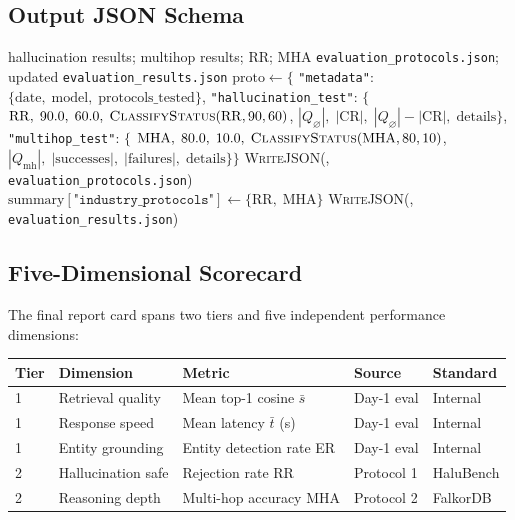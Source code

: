 \documentclass[12pt,a4paper]{article}
\theoremstyle{definition}
\theoremstyle{plain}
\theoremstyle{remark}
\begin{document}
\subsection{Output JSON Schema}

\begin{algorithm}[H]
\caption{\textsc{SaveProtocolResults} --- JSON Serialisation}
\label{alg:save}
\begin{algorithmic}[1]
\Require hallucination results; multihop results; $\mathrm{RR}$; $\mathrm{MHA}$
\Ensure \texttt{evaluation\_protocols.json}; updated \texttt{evaluation\_results.json}
\State $\text{proto} \gets \{$
\State \quad \texttt{"metadata"}: $\{\text{date},\; \text{model},\;
  \text{protocols\_tested}\}$,
\State \quad \texttt{"hallucination\_test"}: $\{$
\State \qquad $\mathrm{RR},\; 90.0,\; 60.0,\;
  \textsc{ClassifyStatus}(\mathrm{RR}, 90, 60)$,
\State \qquad $|Q_\varnothing|,\;
  |\mathrm{CR}|,\; |Q_\varnothing| - |\mathrm{CR}|,\;
  \text{details}\}$,
\State \quad \texttt{"multihop\_test"}: $\{$
\State \qquad $\mathrm{MHA},\; 80.0,\; 10.0,\;
  \textsc{ClassifyStatus}(\mathrm{MHA}, 80, 10)$,
\State \qquad $|Q_\text{mh}|,\;
  |\text{successes}|,\; |\text{failures}|,\;
  \text{details}\}\}$
\State \textsc{WriteJSON}(, \texttt{evaluation\_protocols.json})
\State $\text{summary}[\texttt{"industry\_protocols"}] \gets
  \{\mathrm{RR},\; \mathrm{MHA}\}$
\State \textsc{WriteJSON}(, \texttt{evaluation\_results.json})
\end{algorithmic}
\end{algorithm}

\subsection{Five-Dimensional Scorecard}

The final report card spans two tiers and five independent performance
dimensions:

\begin{center}
\renewcommand{\arraystretch}{1.35}
\begin{tabular}{lllll}
\toprule
\textbf{Tier} & \textbf{Dimension} & \textbf{Metric} &
\textbf{Source} & \textbf{Standard} \\
\midrule
1 & Retrieval quality  & Mean top-1 cosine $\bar{s}$   &
  Day-1 eval & Internal \\
1 & Response speed     & Mean latency $\bar{t}$ (s)    &
  Day-1 eval & Internal \\
1 & Entity grounding   & Entity detection rate ER       &
  Day-1 eval & Internal \\
2 & Hallucination safe & Rejection rate RR              &
  Protocol 1  & HaluBench \\
2 & Reasoning depth    & Multi-hop accuracy MHA         &
  Protocol 2  & FalkorDB \\
\bottomrule
\end{tabular}
\end{center}
\end{document}
